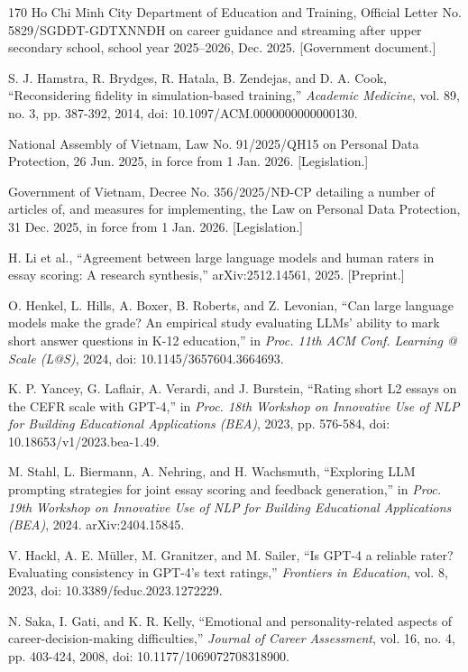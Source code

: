\begin{thebibliography}{170}
 Ho Chi Minh City Department of Education and Training, Official Letter No. 5829/SGDĐT-GDTXNNĐH on career guidance and streaming after upper secondary school, school year 2025--2026, Dec. 2025. [Government document.]

 S. J. Hamstra, R. Brydges, R. Hatala, B. Zendejas, and D. A. Cook, ``Reconsidering fidelity in simulation-based training,'' \textit{Academic Medicine}, vol. 89, no. 3, pp. 387-392, 2014, doi: 10.1097/ACM.0000000000000130.

 National Assembly of Vietnam, Law No. 91/2025/QH15 on Personal Data Protection, 26 Jun. 2025, in force from 1 Jan. 2026. [Legislation.]

 Government of Vietnam, Decree No. 356/2025/NĐ-CP detailing a number of articles of, and measures for implementing, the Law on Personal Data Protection, 31 Dec. 2025, in force from 1 Jan. 2026. [Legislation.]

 H. Li et al., ``Agreement between large language models and human raters in essay scoring: A research synthesis,'' arXiv:2512.14561, 2025. [Preprint.]

 O. Henkel, L. Hills, A. Boxer, B. Roberts, and Z. Levonian, ``Can large language models make the grade? An empirical study evaluating LLMs' ability to mark short answer questions in K-12 education,'' in \textit{Proc. 11th ACM Conf. Learning @ Scale (L@S)}, 2024, doi: 10.1145/3657604.3664693.

 K. P. Yancey, G. Laflair, A. Verardi, and J. Burstein, ``Rating short L2 essays on the CEFR scale with GPT-4,'' in \textit{Proc. 18th Workshop on Innovative Use of NLP for Building Educational Applications (BEA)}, 2023, pp. 576-584, doi: 10.18653/v1/2023.bea-1.49.

 M. Stahl, L. Biermann, A. Nehring, and H. Wachsmuth, ``Exploring LLM prompting strategies for joint essay scoring and feedback generation,'' in \textit{Proc. 19th Workshop on Innovative Use of NLP for Building Educational Applications (BEA)}, 2024. arXiv:2404.15845.

 V. Hackl, A. E. Müller, M. Granitzer, and M. Sailer, ``Is GPT-4 a reliable rater? Evaluating consistency in GPT-4's text ratings,'' \textit{Frontiers in Education}, vol. 8, 2023, doi: 10.3389/feduc.2023.1272229.

 N. Saka, I. Gati, and K. R. Kelly, ``Emotional and personality-related aspects of career-decision-making difficulties,'' \textit{Journal of Career Assessment}, vol. 16, no. 4, pp. 403-424, 2008, doi: 10.1177/1069072708318900.


\end{thebibliography}
